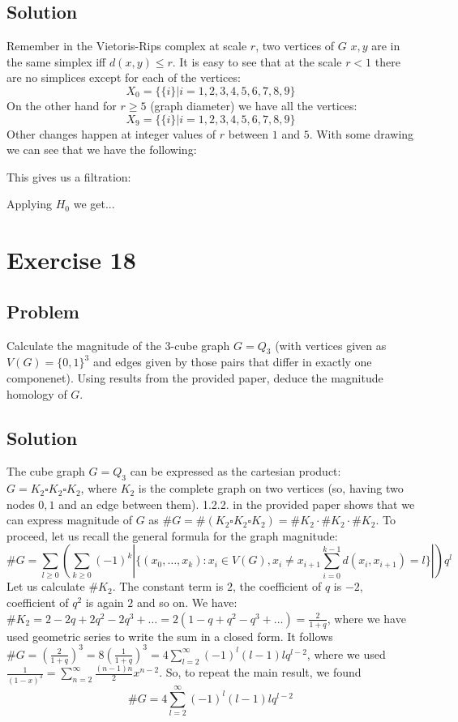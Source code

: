 \documentclass{article}
\begin{document}
\subsection*{Solution}
Remember in the Vietoris-Rips complex at scale $r$, two vertices of $G$ $x,y$ are in the same simplex iff $d(x,y) \leq r$.
It is easy to see that at the scale $r<1$ there are no simplices except for each of the vertices:
\begin{equation*}
X_0 = \{\{i\} | i=1,2,3,4,5,6,7,8,9 \}
\end{equation*}
On the other hand for $r\geq 5$ (graph diameter) we have all the vertices:
\begin{equation*}
X_9 = \{\{i\} | i=1,2,3,4,5,6,7,8,9 \}
\end{equation*}
Other changes happen at integer values of $r$ between $1$ and $5$. With some drawing we can see that we have the following:

This gives us a filtration:

Applying $H_0$ we get...


\section*{Exercise 18}
\subsection*{Problem}
Calculate the magnitude of the 3-cube graph $G=Q_3$ (with vertices given as $V(G) = \{0,1\}^3$ and edges given by those pairs that differ in exactly one componenet). Using results from the provided paper, deduce the magnitude homology of $G$.
\subsection*{Solution}
The cube graph $G=Q_3$ can be expressed as the cartesian product: $G=K_2 \square K_2 \square K_2$, where $K_2$ is the complete graph on two vertices (so, having two nodes $0,1$ and an edge between them).
1.2.2. in the provided paper shows that we can express magnitude of $G$ as
$\#G = \#(K_2 \square K_2 \square K_2) = \#K_2 \cdot \#K_2 \cdot \#K_2$.
To proceed, let us recall the general formula for the graph magnitude:
\begin{equation*}
\#G = \sum_{l \geq 0}\left(\sum_{k \geq 0}(-1)^k \left| \{(x_0,\dots,x_k) : x_i \in V(G), x_i \neq x_{i+1} \sum_{i=0}^{k-1} d(x_i,x_{i+1}) = l \} \right| \right) q^l
\end{equation*}
Let us calculate $\#K_2$. The constant term is $2$, the coefficient of $q$ is $-2$, coefficient of $q^2$ is again $2$ and so on.
We have: $\#K_2 = 2-2q+2q^2-2q^3+\dots = 2(1-q+q^2-q^3+\dots) = \frac{2}{1+q}$, where we have used geometric series to write the sum in a closed form.
It follows $\#G = (\frac{2}{1+q})^3 = 8(\frac{1}{1+q})^3 = 4 \sum_{l=2}^\infty (-1)^{l}(l-1)l q^{l-2}$, where we used $\frac{1}{(1-x)^3} = \sum_{n=2}^\infty \frac{(n-1)n}{2} x^{n-2}$.
So, to repeat the main result, we found
\begin{equation*}
\#G = 4 \sum_{l=2}^\infty (-1)^l (l-1)l q^{l-2}
\end{equation*}
\end{document}
